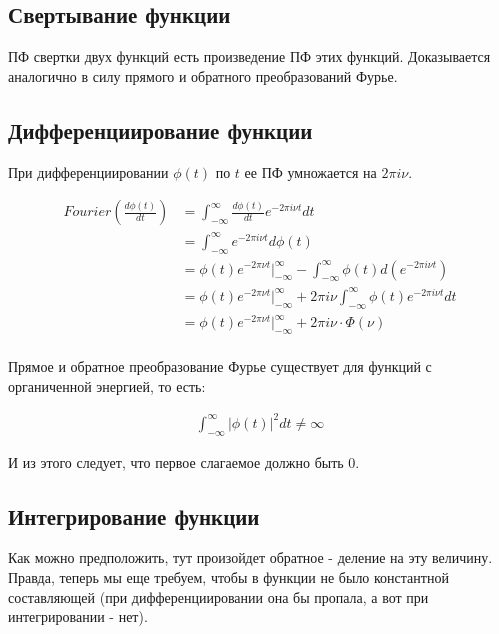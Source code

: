 \documentclass[a4paper,12pt]{report}
\begin{document}
    \subsection{Свертывание функции}
    
    ПФ свертки двух функций есть произведение ПФ этих функций. Доказывается аналогично в силу  прямого и обратного преобразований Фурье.
    
    \subsection{Дифференциирование функции}
    
    При дифференциировании $\phi(t)$ по $t$ ее ПФ умножается на $2\pi i \nu$.
    
    \[
        \begin{aligned}
            Fourier\left(\frac{d\phi(t)}{dt}\right) 
            &= \int_{-\infty}^{\infty} \frac{d\phi(t)}{dt} e^{-2\pi i\nu t} dt \\
            &= \int_{-\infty}^{\infty} e^{-2\pi i\nu t} d\phi(t) \\
            &= \phi(t) e^{-2\pi\nu t} \bigg|_{-\infty}^{\infty} - \int_{-\infty}^{\infty} \phi(t) d\left(e^{-2\pi i\nu t}\right) \\
            &= \phi(t) e^{-2\pi\nu t} \bigg|_{-\infty}^{\infty} + 2\pi i\nu \int_{-\infty}^{\infty} \phi(t) e^{-2\pi i\nu t} dt \\
            &= \phi(t) e^{-2\pi\nu t} \bigg|_{-\infty}^{\infty} + 2\pi i\nu \cdot \Phi(\nu) \\
        \end{aligned}
    \]
    
    Прямое и обратное преобразование Фурье существует для функций с органиченной энергией, то есть:
    
    \[
        \begin{aligned}
            \int_{-\infty}^{\infty} |\phi(t)|^2 dt \neq \infty
        \end{aligned}
    \]
    
    И из этого следует, что первое слагаемое должно быть 0.
    
    \subsection{Интегрирование функции}
    
    Как можно предположить, тут произойдет обратное - деление на эту величину. Правда, теперь мы еще требуем, чтобы в функции не было константной составляющей (при дифференциировании она бы пропала, а вот при интегрировании - нет).
    
\end{document}
